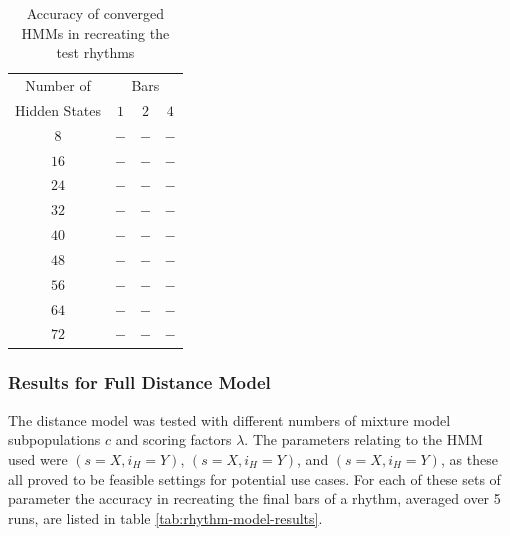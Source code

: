 \documentclass[ author={Stephen Livermore-Tozer},
				supervisor={Dr. Peter Flach},
				degree={MEng},
				title={Algorithmic Co-composition Using Machine Learning},
				subtitle={},
				type={research},
				year={2016} ]{dissertation}
\begin{document}
	\begin{table}[h]
		\begin{center}
			\begin{tabular}{cccc}
				\toprule
				Number of& \multicolumn{3}{c}{Bars}\\
				\cline{2-4}
				Hidden States& $1$ & $2$ & $4$\\
				\hline
				$8$ & $-$ & $-$ & $-$\\
				$16$ & $-$ & $-$ & $-$\\
				$24$ & $-$ & $-$ & $-$\\
				$32$ & $-$ & $-$ & $-$\\
				$40$ & $-$ & $-$ & $-$\\
				$48$ & $-$ & $-$ & $-$\\
				$56$ & $-$ & $-$ & $-$\\
				$64$ & $-$ & $-$ & $-$\\
				$72$ & $-$ & $-$ & $-$\\
				\bottomrule
			\end{tabular}
		\end{center}
		\caption{Accuracy of converged HMMs in recreating the test rhythms}
		\label{tab:hmm-results}
	\end{table}
	
	\subsubsection{Results for Full Distance Model}
	
	The distance model was tested with different numbers of mixture model subpopulations $c$ and scoring factors $\lambda$. The parameters relating to the HMM used were $(s = X, i_H = Y)$, $(s = X, i_H = Y)$, and $(s = X, i_H = Y)$, as these all proved to be feasible settings for potential use cases. For each of these sets of parameter the accuracy in recreating the final bars of a rhythm, averaged over 5 runs, are listed in table \ref{tab:rhythm-model-results}.
	
\end{document}
